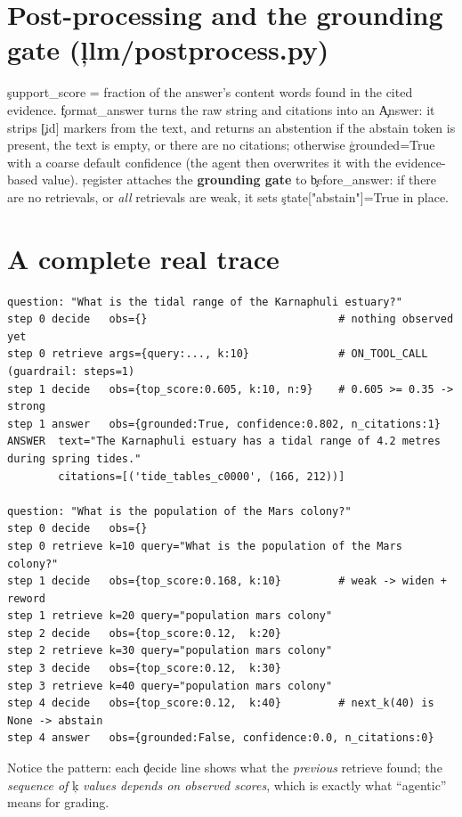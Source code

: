 \section{Post-processing and the grounding gate (\c{llm/postprocess.py})}
\c{support\_score} = fraction of the answer's content words found in the cited evidence. \c{format\_answer} turns the raw string and citations into an \c{Answer}: it strips \c{[id]} markers from the text, and returns an abstention if the abstain token is present, the text is empty, or there are no citations; otherwise \c{grounded=True} with a coarse default confidence (the agent then overwrites it with the evidence-based value). \c{register} attaches the \textbf{grounding gate} to \c{before\_answer}: if there are no retrievals, or \emph{all} retrievals are weak, it sets \c{state["abstain"]=True} in place.

\section{A complete real trace}
\begin{lstlisting}[style=plain]
question: "What is the tidal range of the Karnaphuli estuary?"
step 0 decide   obs={}                              # nothing observed yet
step 0 retrieve args={query:..., k:10}              # ON_TOOL_CALL (guardrail: steps=1)
step 1 decide   obs={top_score:0.605, k:10, n:9}    # 0.605 >= 0.35 -> strong
step 1 answer   obs={grounded:True, confidence:0.802, n_citations:1}
ANSWER  text="The Karnaphuli estuary has a tidal range of 4.2 metres during spring tides."
        citations=[('tide_tables_c0000', (166, 212))]

question: "What is the population of the Mars colony?"
step 0 decide   obs={}
step 0 retrieve k=10 query="What is the population of the Mars colony?"
step 1 decide   obs={top_score:0.168, k:10}         # weak -> widen + reword
step 1 retrieve k=20 query="population mars colony"
step 2 decide   obs={top_score:0.12,  k:20}
step 2 retrieve k=30 query="population mars colony"
step 3 decide   obs={top_score:0.12,  k:30}
step 3 retrieve k=40 query="population mars colony"
step 4 decide   obs={top_score:0.12,  k:40}         # next_k(40) is None -> abstain
step 4 answer   obs={grounded:False, confidence:0.0, n_citations:0}
\end{lstlisting}
Notice the pattern: each \c{decide} line shows what the \emph{previous} retrieve found; the \emph{sequence of} \c{k} \emph{values depends on observed scores}, which is exactly what ``agentic'' means for grading.
